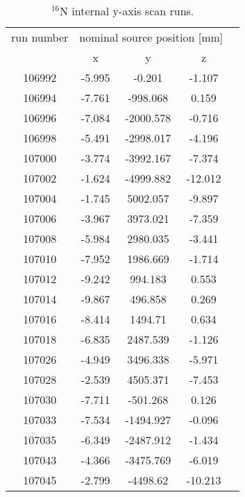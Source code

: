 \begin{table}[ht]\label{n16scanTable_yscan}
		\caption[]{$^{16}$N internal y-axis scan runs.}
				\centering
	\begin{tabular*}{90mm}{c@{\extracolsep{\fill}}*4c}
		\toprule 
		run number  & \multicolumn{3}{c}{nominal source position [mm]}  \\
		\cline{2-4}
		& x & y & z\\
		\midrule        
        106992 & -5.995 & -0.201 & -1.107\\
        106994 & -7.761 & -998.068 & 0.159\\
        106996 & -7.084 & -2000.578 & -0.716\\
        106998 & -5.491 & -2998.017 & -4.196\\
        107000 & -3.774 & -3992.167 & -7.374\\
        107002 & -1.624 & -4999.882 & -12.012\\
        107004 & -1.745 & 5002.057 & -9.897\\
        107006 & -3.967 & 3973.021 & -7.359\\
        107008 & -5.984 & 2980.035 & -3.441\\
        107010 & -7.952 & 1986.669 & -1.714\\
        107012 & -9.242 & 994.183 & 0.553\\
        107014 & -9.867 & 496.858 & 0.269\\
        107016 & -8.414 & 1494.71 & 0.634\\
        107018 & -6.835 & 2487.539 & -1.126\\
        107026 & -4.949 & 3496.338 & -5.971\\
        107028 & -2.539 & 4505.371 & -7.453\\
        107030 & -7.711 & -501.268 & 0.126\\
        107033 & -7.534 & -1494.927 & -0.096\\
        107035 & -6.349 & -2487.912 & -1.434\\
        107043 & -4.366 & -3475.769 & -6.019\\
        107045 & -2.799 & -4498.62 & -10.213\\
        		\bottomrule	
       	\end{tabular*}
   \end{table} 

